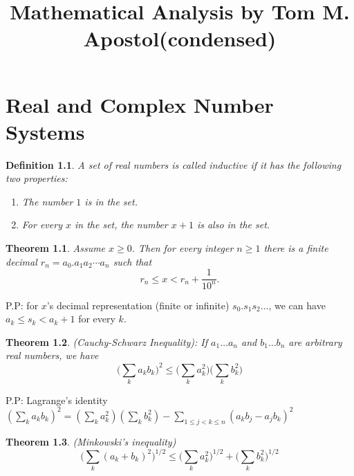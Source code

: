 \documentclass[10pt,a4paper]{book}
\begin{document}
	
	\renewcommand{\familydefault}{ptm}
	\title{Mathematical Analysis by Tom M. Apostol(condensed)}
	\maketitle
	\chapter{Real and Complex Number Systems}

	\newtheorem{Thm}{Theorem}
		\newtheorem{deff}{Definition}
	\begin{deff}
		A set of real numbers is called inductive if it has the following two properties:
		\begin{enumerate}
			\item The number $1$ is in the set.
			\item For every $x$ in the set, the number $x+1$ is also in the set.
		\end{enumerate}
	\end{deff}
\begin{Thm}
	Assume $x \geq 0$. Then for every integer  $n \geq 1$ there is a finite decimal $r_n = a_0.a_1a_2 \cdots a_n$ such that
	$$r_n \leq x < r_n + \frac{1}{10^n}.$$
\end{Thm}
\noindent P.P: for $x$'s decimal representation (finite or infinite) $s_0. s_1s_2 \dots$, we can have $a_k \leq s_k < a_k + 1 $ for every $k$.
\begin{Thm}
	(Cauchy-Schwarz Inequality): If $a_1 \dots a_n$ and $b_1 \dots b_n$ are arbitrary real numbers, we have
	$$\bigg(\sum_k a_kb_k\bigg)^2 \leq \bigg(\sum_k a_k^2\bigg)\bigg(\sum_k b_k^2\bigg)$$ 
\end{Thm}
\noindent P.P: Lagrange's identity $(\sum_k a_kb_k)^2 = (\sum_k a_k^2)(\sum_k b_k^2) - \sum_{1 \leq j < k \leq n}(a_kb_j - a_jb_k)^2$
\begin{Thm}
	(Minkowski's inequality)$$\bigg(\sum_k (a_k + b_k)^2 \bigg)^{1/2} \leq \bigg(\sum_k a_k^2 \bigg)^{1/2} + \bigg(\sum_k b_k^2 \bigg)^{1/2}$$
\end{Thm}
\end{document}

